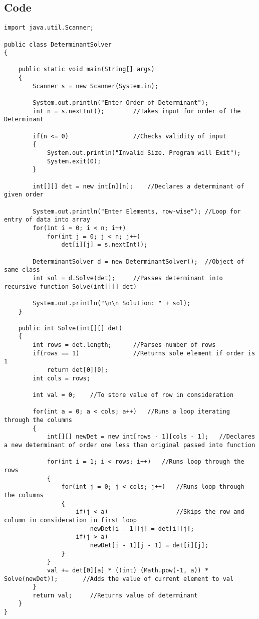 \documentclass[ProgrammingAssignment.tex]{subfiles}
\begin{document}
\subsection{Code}

\begin{lstlisting}
import java.util.Scanner;

public class DeterminantSolver
{

	public static void main(String[] args)
	{
		Scanner s = new Scanner(System.in);
		
		System.out.println("Enter Order of Determinant");
		int n = s.nextInt();		//Takes input for order of the Determinant
		
		if(n <= 0)					//Checks validity of input
		{
			System.out.println("Invalid Size. Program will Exit");
			System.exit(0);
		}
		
		int[][] det = new int[n][n];	//Declares a determinant of given order
		
		System.out.println("Enter Elements, row-wise");	//Loop for entry of data into array
		for(int i = 0; i < n; i++)
			for(int j = 0; j < n; j++)
				det[i][j] = s.nextInt();
		
		DeterminantSolver d = new DeterminantSolver();	//Object of same class
		int sol = d.Solve(det);		//Passes determinant into recursive function Solve(int[][] det)
		
		System.out.println("\n\n Solution: " + sol);	
	}

	public int Solve(int[][] det)
	{
		int rows = det.length;		//Parses number of rows
		if(rows == 1)				//Returns sole element if order is 1
			return det[0][0];
		int cols = rows;
		
		int val = 0;	//To store value of row in consideration
		
		for(int a = 0; a < cols; a++)	//Runs a loop iterating through the columns
		{
			int[][] newDet = new int[rows - 1][cols - 1];	//Declares a new determinant of order one less than original passed into function
			
			for(int i = 1; i < rows; i++)	//Runs loop through the rows
			{		
				for(int j = 0; j < cols; j++)	//Runs loop through the columns
				{	
					if(j < a)					//Skips the row and column in consideration in first loop
						newDet[i - 1][j] = det[i][j];
					if(j > a)
						newDet[i - 1][j - 1] = det[i][j];
				}
			}
			val += det[0][a] * ((int) (Math.pow(-1, a)) * Solve(newDet));		//Adds the value of current element to val
		}
		return val;		//Returns value of determinant
	}
}
\end{lstlisting}
\end{document}
